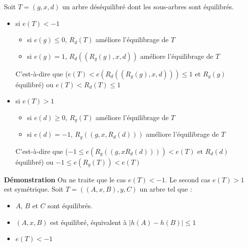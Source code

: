 \documentclass[../../../main.tex]{subfiles}
\begin{document}
 Soit $T = (g, x, d)$ un arbre déséquilibré dont les sous-arbres sont équilibrés.
\begin{itemize}
	\item si $e(T) < -1$
	\begin{itemize}
		\item si $e(g)\leq 0$, $R_d(T)$ améliore l'équilibrage de $T$
		\item si $e(g) = 1$, $R_d((R_g(g), x, d))$ améliore l'équilibrage de $T$
	\end{itemize}
	C'est-à-dire que ($e(T) < e(R_d((R_g(g), x, d))) \leq 1$ et $R_g(g)$ équilibré) ou $e(T) < R_d(T) \leq 1$
	\item si $e(T) > 1$
	\begin{itemize}
		\item si $e(d)\geq 0$, $R_g(T)$ améliore l'équilibrage de $T$
		\item si $e(d) = -1$, $R_g((g, x, R_d(d)))$ améliore l'équilibrage de $T$
	\end{itemize}
	C'est-à-dire que ($-1 \leq e(R_g((g, x R_d(d)))) < e(T)$ et $R_d(d)$ équilibré) ou $-1\leq e(R_g(T)) < e(T)$
\end{itemize}
\textbf{Démonstration} On ne traite que le cas $e(T) < -1$. Le second cas $e(T) > 1$ est symétrique.\newline
Soit $T = ((A, x, B), y, C)$ un arbre tel que :
\begin{itemize}
	\item $A$, $B$ et $C$ sont équilibrés.
	\item $(A, x, B)$ est équilibré, équivalent à $|h(A) - h(B)| \leq 1$
	\item $e(T) < -1$
\end{itemize}
\end{document}

